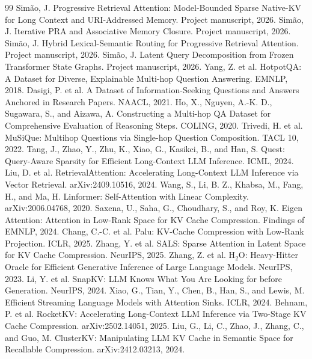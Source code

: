 \documentclass[11pt]{article}
\begin{document}
\begin{thebibliography}{99}
 Sim\~ao, J. Progressive Retrieval Attention: Model-Bounded Sparse Native-KV for Long Context and URI-Addressed Memory. Project manuscript, 2026.
 Sim\~ao, J. Iterative PRA and Associative Memory Closure. Project manuscript, 2026.
 Sim\~ao, J. Hybrid Lexical-Semantic Routing for Progressive Retrieval Attention. Project manuscript, 2026.
 Sim\~ao, J. Latent Query Decomposition from Frozen Transformer State Graphs. Project manuscript, 2026.
 Yang, Z. et al. HotpotQA: A Dataset for Diverse, Explainable Multi-hop Question Answering. EMNLP, 2018.
 Dasigi, P. et al. A Dataset of Information-Seeking Questions and Answers Anchored in Research Papers. NAACL, 2021.
 Ho, X., Nguyen, A.-K. D., Sugawara, S., and Aizawa, A. Constructing a Multi-hop QA Dataset for Comprehensive Evaluation of Reasoning Steps. COLING, 2020.
 Trivedi, H. et al. MuSiQue: Multihop Questions via Single-hop Question Composition. TACL 10, 2022.
 Tang, J., Zhao, Y., Zhu, K., Xiao, G., Kasikci, B., and Han, S. Quest: Query-Aware Sparsity for Efficient Long-Context LLM Inference. ICML, 2024.
 Liu, D. et al. RetrievalAttention: Accelerating Long-Context LLM Inference via Vector Retrieval. arXiv:2409.10516, 2024.
 Wang, S., Li, B. Z., Khabsa, M., Fang, H., and Ma, H. Linformer: Self-Attention with Linear Complexity. arXiv:2006.04768, 2020.
 Saxena, U., Saha, G., Choudhary, S., and Roy, K. Eigen Attention: Attention in Low-Rank Space for KV Cache Compression. Findings of EMNLP, 2024.
 Chang, C.-C. et al. Palu: KV-Cache Compression with Low-Rank Projection. ICLR, 2025.
 Zhang, Y. et al. SALS: Sparse Attention in Latent Space for KV Cache Compression. NeurIPS, 2025.
 Zhang, Z. et al. H$_2$O: Heavy-Hitter Oracle for Efficient Generative Inference of Large Language Models. NeurIPS, 2023.
 Li, Y. et al. SnapKV: LLM Knows What You Are Looking for before Generation. NeurIPS, 2024.
 Xiao, G., Tian, Y., Chen, B., Han, S., and Lewis, M. Efficient Streaming Language Models with Attention Sinks. ICLR, 2024.
 Behnam, P. et al. RocketKV: Accelerating Long-Context LLM Inference via Two-Stage KV Cache Compression. arXiv:2502.14051, 2025.
 Liu, G., Li, C., Zhao, J., Zhang, C., and Guo, M. ClusterKV: Manipulating LLM KV Cache in Semantic Space for Recallable Compression. arXiv:2412.03213, 2024.

\end{thebibliography}
\end{document}
